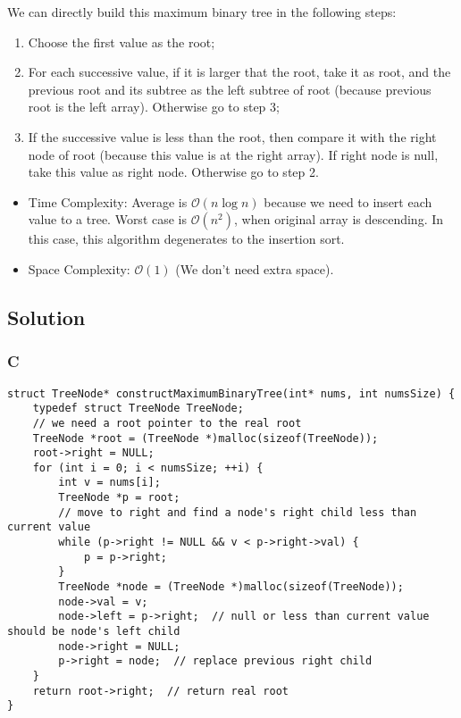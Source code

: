 We can directly build this maximum binary tree in the following steps:
\begin{enumerate}
	\item Choose the first value as the root;
	\item For each successive value, if it is larger that the root, take it as root, and the previous root and its subtree as the left subtree of root (because previous root is the left array). Otherwise go to step 3;
	\item If the successive value is less than the root, then compare it with the right node of root (because this value is at the right array). If right node is null, take this value as right node. Otherwise go to step 2.
\end{enumerate}
\begin{itemize}
\item Time Complexity: Average is $\mathcal{O}(n{\log}{n})$ because we need to insert each value to a tree. Worst case is $\mathcal{O}(n^2)$, when original array is descending. In this case, this algorithm degenerates to the insertion sort.
\item Space Complexity: $\mathcal{O}(1)$ (We don't need extra space).
\end{itemize}

\subsection*{Solution}
\subsubsection*{C}
\begin{verbatim}
struct TreeNode* constructMaximumBinaryTree(int* nums, int numsSize) {
    typedef struct TreeNode TreeNode;
    // we need a root pointer to the real root
    TreeNode *root = (TreeNode *)malloc(sizeof(TreeNode));
    root->right = NULL;
    for (int i = 0; i < numsSize; ++i) {
        int v = nums[i];
        TreeNode *p = root;
        // move to right and find a node's right child less than current value
        while (p->right != NULL && v < p->right->val) {
            p = p->right;
        }
        TreeNode *node = (TreeNode *)malloc(sizeof(TreeNode));
        node->val = v;
        node->left = p->right;  // null or less than current value should be node's left child
        node->right = NULL;
        p->right = node;  // replace previous right child
    }
    return root->right;  // return real root
}
\end{verbatim}

\newpage

